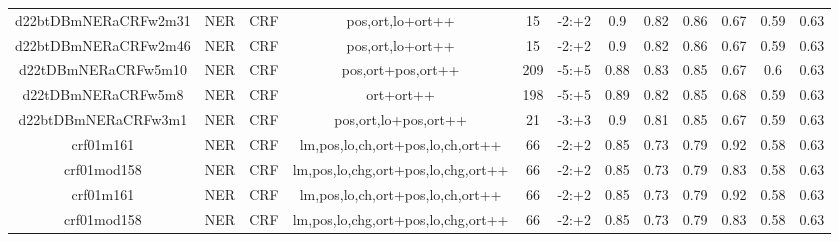 \documentclass[a4paper]{article}
\begin{document}
\begin{landscape}
\begin{center}
\begin{tabular}{ |c|c|c|c|c|c|c|c|c|c|c|c|}
 
 	
 	\small{ d22btDBmNERaCRFw2m31 } & \small{ NER} & \small{  CRF }  & pos,ort,lo+ort++  &  15 &  \small{  -2:+2 }  &  0.9 & 0.82 & 0.86  &  0.67 & 0.59 & 0.63 \\
 	

 
 	
 	\small{ d22btDBmNERaCRFw2m46 } & \small{ NER} & \small{  CRF }  & pos,ort,lo+ort++  &  15 &  \small{  -2:+2 }  &  0.9 & 0.82 & 0.86  &  0.67 & 0.59 & 0.63 \\
 	

 
 	
 	\small{ d22tDBmNERaCRFw5m10 } & \small{ NER} & \small{  CRF }  & pos,ort+pos,ort++  &  209 &  \small{  -5:+5 }  &  0.88 & 0.83 & 0.85  &  0.67 & 0.6 & 0.63 \\
 	

 
 	
 	\small{ d22tDBmNERaCRFw5m8 } & \small{ NER} & \small{  CRF }  & ort+ort++  &  198 &  \small{  -5:+5 }  &  0.89 & 0.82 & 0.85  &  0.68 & 0.59 & 0.63 \\
 	

 
 	
 	\small{ d22btDBmNERaCRFw3m1 } & \small{ NER} & \small{  CRF }  & pos,ort,lo+pos,ort++  &  21 &  \small{  -3:+3 }  &  0.9 & 0.81 & 0.85  &  0.67 & 0.59 & 0.63 \\
 	

 
 	
 	\small{ crf01m161 } & \small{ NER} & \small{  CRF }  & lm,pos,lo,ch,ort+pos,lo,ch,ort++  &  66 &  \small{  -2:+2 }  &  0.85 & 0.73 & 0.79  &  0.92 & 0.58 & 0.63 \\
 	

 
 	
 	\small{ crf01mod158 } & \small{ NER} & \small{  CRF }  & lm,pos,lo,chg,ort+pos,lo,chg,ort++  &  66 &  \small{  -2:+2 }  &  0.85 & 0.73 & 0.79  &  0.83 & 0.58 & 0.63 \\
 	

 
 	
 	\small{ crf01m161 } & \small{ NER} & \small{  CRF }  & lm,pos,lo,ch,ort+pos,lo,ch,ort++  &  66 &  \small{  -2:+2 }  &  0.85 & 0.73 & 0.79  &  0.92 & 0.58 & 0.63 \\
 	

 
 	
 	\small{ crf01mod158 } & \small{ NER} & \small{  CRF }  & lm,pos,lo,chg,ort+pos,lo,chg,ort++  &  66 &  \small{  -2:+2 }  &  0.85 & 0.73 & 0.79  &  0.83 & 0.58 & 0.63 \\
 	


\end{tabular}
\end{center}
\end{landscape}
\end{document}
